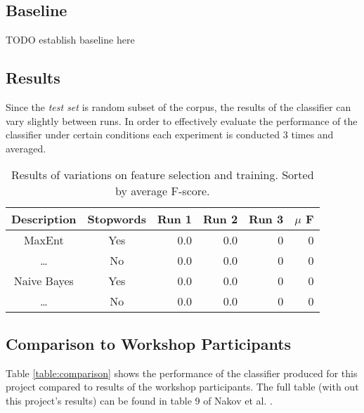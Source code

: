 \documentclass[12pt]{article}
\begin{document}
\subsection{Baseline}

TODO establish baseline here

\subsection{Results}

Since the \textit{test set} is random subset of the corpus, the results of the
classifier can vary slightly between runs. In order to effectively evaluate the
performance of the classifier under certain conditions each experiment is
conducted 3 times and averaged.

\begin{table}[H]
    \begin{center}
    \begin{tabular}{|c|c|r|r|r|r|}
        \hline
        Description & Stopwords & Run 1 & Run 2 & Run 3 & $\mu$ F\\
        \hline
        MaxEnt      & Yes       & 0.0   & 0.0   & 0     & 0 \\
        \dots       & No        & 0.0   & 0.0   & 0     & 0 \\
        Naive Bayes & Yes       & 0.0   & 0.0   & 0     & 0 \\
        \dots       & No        & 0.0   & 0.0   & 0     & 0 \\
        \hline
    \end{tabular}
    \end{center}
    \caption{Results of variations on feature selection and training. Sorted by
        average F-score.}
    \label{table:results}
\end{table}

\subsection{Comparison to Workshop Participants}

Table \ref{table:comparison} shows the performance of the classifier produced
for this project compared to results of the workshop participants. The full
table (with out this project's results) can be found in table 9 of Nakov et al.
\cite{Nakov2013}.
\end{document}
